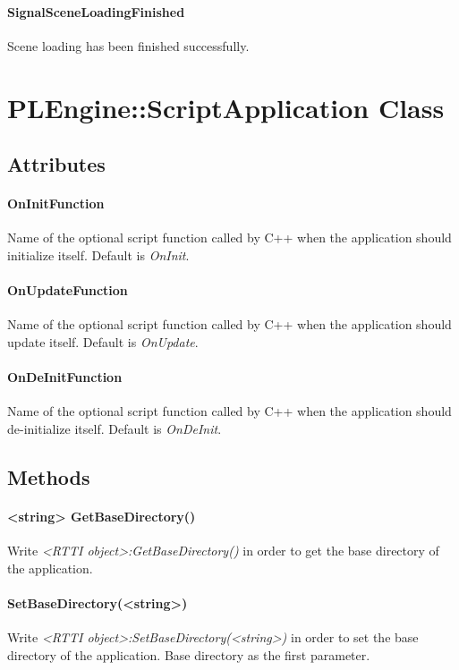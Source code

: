 \paragraph{SignalSceneLoadingFinished}
Scene loading has been finished successfully.




\section{PLEngine::ScriptApplication Class}


\subsection{Attributes}

\paragraph{OnInitFunction}
Name of the optional script function called by C++ when the application should initialize itself. Default is \emph{OnInit}.

\paragraph{OnUpdateFunction}
Name of the optional script function called by C++ when the application should update itself. Default is \emph{OnUpdate}.

\paragraph{OnDeInitFunction}
Name of the optional script function called by C++ when the application should de-initialize itself. Default is \emph{OnDeInit}.


\subsection{Methods}

\paragraph{<string> GetBaseDirectory()}
Write \emph{<RTTI object>:GetBaseDirectory()} in order to get the base directory of the application.

\paragraph{SetBaseDirectory(<string>)}
Write \emph{<RTTI object>:SetBaseDirectory(<string>)} in order to set the base directory of the application. Base directory as the first parameter.

